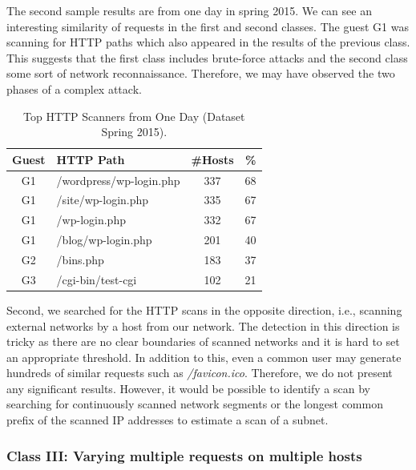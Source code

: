 The second sample results are from one day in spring 2015. We can see an interesting similarity of requests in the first and second classes. The guest G1 was scanning for HTTP paths which also appeared in the results of the previous class. This suggests that the first class includes brute-force attacks and the second class some sort of network reconnaissance. Therefore, we may have observed the two phases of a complex attack.

\begin{table}[ht]
\centering
\begin{tabular}{| c | l | c | r |} \hline
Guest & HTTP Path & \#Hosts & \% \\ \hline
G1 & /wordpress/wp-login.php & 337 & 68 \\ \hline
G1 & /site/wp-login.php & 335 & 67 \\ \hline
G1 & /wp-login.php & 332 & 67 \\ \hline
G1 & /blog/wp-login.php & 201 & 40 \\ \hline
G2 & /bins.php & 183 & 37 \\ \hline
G3 & /cgi-bin/test-cgi & 102 & 21 \\ \hline
\end{tabular}
\caption{Top HTTP Scanners from One Day (Dataset Spring 2015).}
\label{tab:httpsecurity-scanners2}
\end{table}

Second, we searched for the HTTP scans in the opposite direction, i.e., scanning external networks by a host from our network. The detection in this direction is tricky as there are no clear boundaries of scanned networks and it is hard to set an appropriate threshold. In addition to this, even a common user may generate hundreds of similar requests such as \textit{/favicon.ico}. Therefore, we do not present any significant results. However, it would be possible to identify a scan by searching for continuously scanned network segments or the longest common prefix of the scanned IP addresses to estimate a scan of a subnet.

\subsubsection{Class III: Varying multiple requests on multiple hosts}

